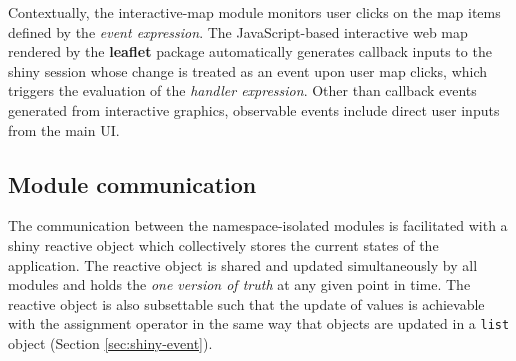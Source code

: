 \documentclass{aucklandthesis}
\begin{document}
\begin{Shaded}
\begin{Highlighting}[]
\StringTok{ }
\StringTok{ }
    \NormalTok{(input[[}\NormalTok{]], \{}
\NormalTok{      state[[}\NormalTok{]] <-}\StringTok{ }\NormalTok{input[[}\NormalTok{]][[}\NormalTok{]]}
\NormalTok{    \})}
\NormalTok{  \}}
\NormalTok{\}}
\end{Highlighting}
\end{Shaded}

Contextually, the interactive-map module monitors user clicks on the map items defined by the \emph{event expression}. The JavaScript-based interactive web map rendered by the \textbf{leaflet} package \autocite{leaflet} automatically generates callback inputs to the shiny session whose change is treated as an event upon user map clicks, which triggers the evaluation of the \emph{handler expression}. Other than callback events generated from interactive graphics, observable events include direct user inputs from the main UI.

\hypertarget{module-communication}{%
\subsection{Module communication}\label{module-communication}}

The communication between the namespace-isolated modules is facilitated with a shiny reactive object which collectively stores the current states of the application. The reactive object is shared and updated simultaneously by all modules and holds the \emph{one version of truth} at any given point in time. The reactive object is also subsettable such that the update of values is achievable with the assignment operator in the same way that objects are updated in a \texttt{list} object (Section \ref{sec:shiny-event}).

\begin{Shaded}
\begin{Highlighting}[]
\StringTok{ }
\StringTok{ }
\NormalTok{  \}}
\NormalTok{\}}
\end{Highlighting}
\end{Shaded}
\end{document}
